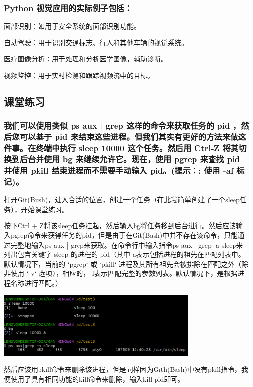 \documentclass[UTF8,a4paper]{ctexart}
\begin{document}
\begin{sloppypar}
	\subsubsection{Python 视觉应用的实际例子包括：}
	面部识别：如用于安全系统的面部识别功能。
	
	自动驾驶：用于识别交通标志、行人和其他车辆的视觉系统。
	
	医疗图像分析：用于处理和分析医学图像，辅助诊断。
	
	视频监控：用于实时检测和跟踪视频流中的目标。
	\subsection{课堂练习}
	\graphicspath{{figure/}}
	\subsubsection{我们可以使用类似 ps aux | grep 这样的命令来获取任务的 pid ，然后您可以基于 pid 来结束这些进程。但我们其实有更好的方法来做这件事。在终端中执行 sleep 10000 这个任务。然后用 Ctrl-Z 将其切换到后台并使用 bg 来继续允许它。现在，使用 pgrep 来查找 pid 并使用 pkill 结束进程而不需要手动输入 pid。(提示：: 使用 -af 标记)。}
	
	\bigskip
	\bigskip
	\bigskip
	\bigskip
	
	打开Git(Bush)，进入合适的位置，创建一个任务（在此我简单创建了一个sleep任务），开始课堂练习。
	
	按下Ctrl + Z将该sleep任务挂起，然后输入bg将任务移到后台进行。然后应该输入pgrep命令来获得任务的pid，但是由于在Git(Bash)中并不存在该命令，只能通过完整地输入ps aux | grep来获取。在命令行中输入指令ps aux | grep -a sleep来列出包含关键字 sleep 的进程的 pid（其中-a表示包括进程的祖先在匹配列表中。默认情况下，当前的 `pgrep` 或 `pkill` 进程及其所有祖先会被排除在匹配之外（除非使用 `-v` 选项），相应的，-f表示匹配完整的参数列表。默认情况下，是根据进程名称进行匹配。）
	
	\includegraphics[width = 10cm]{1}
	
	然后应该用pkill命令来删除该进程，但是同样因为Gith(Bash)中没有pkill指令，我便使用了具有相同功能的kill命令来删除，输入kill pid即可。
	

\end{sloppypar}
\end{document}
